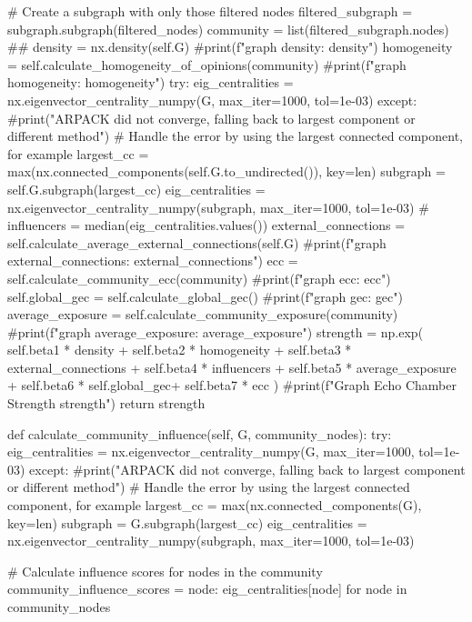 \begin{codigo}[caption={Exemplo de classe Python para deteção de câmaras de eco}, label={codigo:echochamberdetector}, language=Python, breaklines=true]
        # Create a subgraph with only those filtered nodes
        filtered_subgraph = subgraph.subgraph(filtered_nodes)
        community = list(filtered_subgraph.nodes)
        ##
        density = nx.density(self.G)
        #print(f"graph density: {density}")
        homogeneity = self.calculate_homogeneity_of_opinions(community)
        #print(f"graph homogeneity: {homogeneity}")
        try:
            eig_centralities = nx.eigenvector_centrality_numpy(G, max_iter=1000, tol=1e-03)
        except:
            #print("ARPACK did not converge, falling back to largest component or different method")
            # Handle the error by using the largest connected component, for example
            largest_cc = max(nx.connected_components(self.G.to_undirected()), key=len)
            subgraph = self.G.subgraph(largest_cc)
            eig_centralities = nx.eigenvector_centrality_numpy(subgraph, max_iter=1000, tol=1e-03)
        #
        influencers = median(eig_centralities.values())
        external_connections = self.calculate_average_external_connections(self.G)
        #print(f"graph external_connections: {external_connections}")
        ecc = self.calculate_community_ecc(community)
        #print(f"graph ecc: {ecc}")
        self.global_gec = self.calculate_global_gec()
        #print(f"graph gec: {gec}")
        average_exposure = self.calculate_community_exposure(community)
        #print(f"graph average_exposure: {average_exposure}")
        strength = np.exp(
            self.beta1 * density +
            self.beta2 * homogeneity +
            self.beta3 * external_connections +
            self.beta4 * influencers +
            self.beta5 * average_exposure +
            self.beta6 * self.global_gec+
            self.beta7 * ecc
        )
        #print(f"Graph Echo Chamber Strength {strength}")
        return strength

    def calculate_community_influence(self, G, community_nodes):
        try:
            eig_centralities = nx.eigenvector_centrality_numpy(G, max_iter=1000, tol=1e-03)
        except:
            #print("ARPACK did not converge, falling back to largest component or different method")
            # Handle the error by using the largest connected component, for example
            largest_cc = max(nx.connected_components(G), key=len)
            subgraph = G.subgraph(largest_cc)
            eig_centralities = nx.eigenvector_centrality_numpy(subgraph, max_iter=1000, tol=1e-03)

        # Calculate influence scores for nodes in the community
        community_influence_scores = {node: eig_centralities[node] for node in community_nodes}


\end{codigo}
